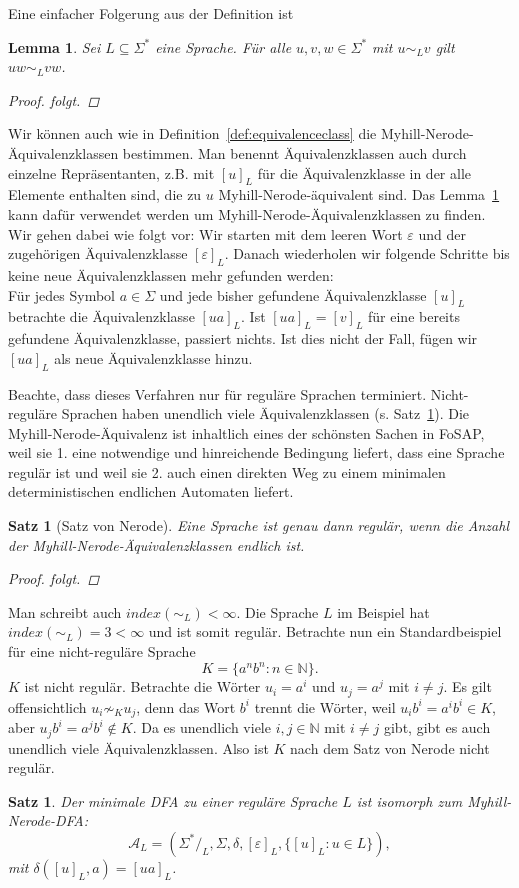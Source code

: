 \documentclass[11pt, a4paper]{article}
\theoremstyle{definition}
\theoremstyle{plain}
\newtheorem{theorem}[definition]{Satz}
\newtheorem{lemma}[definition]{Lemma}
\numberwithin{equation}{section}
\begin{document}
Eine einfacher Folgerung aus der Definition ist
\begin{lemma}\label{lem:mncongruence}
	Sei $L \subseteq \Sigma^\ast$ eine Sprache. Für alle $u, v, w \in \Sigma^\ast$ mit $u \sim_L v$ gilt $uw \sim_L vw$.
	\begin{proof}
		folgt. %
	\end{proof}
\end{lemma}
Wir können auch wie in Definition~\ref{def:equivalenceclass} die Myhill-Nerode-Äquivalenzklassen bestimmen. Man benennt Äquivalenzklassen auch durch einzelne Repräsentanten, z.B. mit $[u]_L$ für die Äquivalenzklasse in der alle Elemente enthalten sind, die zu $u$ Myhill-Nerode-äquivalent sind.
Das Lemma~\ref{lem:mncongruence} kann dafür verwendet werden um Myhill-Nerode-Äquivalenzklassen zu finden. Wir gehen dabei wie folgt vor:
Wir starten mit dem leeren Wort $\varepsilon$ und der zugehörigen Äquivalenzklasse $[\varepsilon]_L$. Danach wiederholen wir folgende Schritte bis keine neue Äquivalenzklassen mehr gefunden werden:\\
Für jedes Symbol $a \in \Sigma$ und jede bisher gefundene Äquivalenzklasse $[u]_L$ betrachte die Äquivalenzklasse $[ua]_L$. Ist $[ua]_L = [v]_L$ für eine bereits gefundene Äquivalenzklasse, passiert nichts. Ist dies nicht der Fall, fügen wir $[ua]_L$ als neue Äquivalenzklasse hinzu.\par
Beachte, dass dieses Verfahren nur für reguläre Sprachen terminiert. Nicht-reguläre Sprachen haben unendlich viele Äquivalenzklassen (s. Satz~\ref{thm:nerode}).
Die Myhill-Nerode-Äquivalenz ist inhaltlich eines der schönsten Sachen in FoSAP, weil sie 1. eine notwendige und hinreichende Bedingung liefert, dass eine Sprache regulär ist und weil sie 2. auch einen direkten Weg zu einem minimalen deterministischen endlichen Automaten liefert.
\begin{theorem}[Satz von Nerode]\label{thm:nerode}
	Eine Sprache ist genau dann regulär, wenn die Anzahl der Myhill-Nerode-Äquivalenzklassen endlich ist.
	\begin{proof}
		folgt. %
	\end{proof}
\end{theorem}
Man schreibt auch $index(\sim_L) < \infty$. Die Sprache $L$ im Beispiel hat $index(\sim_L) = 3 < \infty$ und ist somit regulär. Betrachte nun ein Standardbeispiel für eine nicht-reguläre Sprache 
$$
	K = \{ a^n b^n : n \in \mathbb{N} \}.
$$
$K$ ist nicht regulär. Betrachte die Wörter $u_i = a^i$ und $u_j = a^j$ mit $i \neq j$. Es gilt offensichtlich $u_i \not\sim_K u_j$, denn das Wort $b^i$ trennt die Wörter, weil $u_i b^i = a^i b^i \in K$, aber $u_j b^i = a^j b^i \notin K$. Da es unendlich viele $i, j \in \mathbb{N}$ mit $i \neq j$ gibt, gibt es auch unendlich viele Äquivalenzklassen. Also ist $K$ nach dem Satz von Nerode nicht regulär.
\begin{theorem}
	Der minimale DFA zu einer reguläre Sprache $L$ ist isomorph zum Myhill-Nerode-DFA:
	$$
		\mathcal{A}_L = (\Sigma^\ast/_L, \Sigma, \delta, [\varepsilon]_L, \{[u]_L : u \in L \}),
	$$
	mit $\delta([u]_L, a) = [ua]_L$.
\end{theorem}
\end{document}
